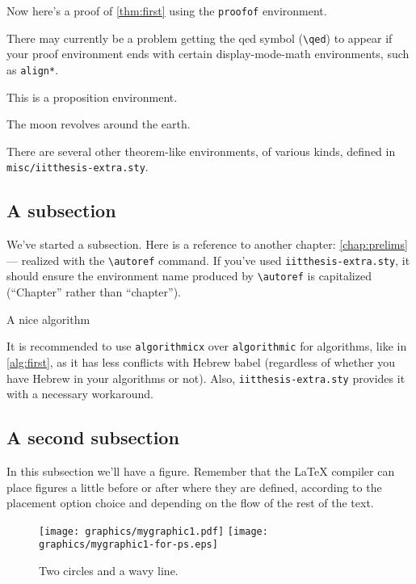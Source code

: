 Now here's a proof of \autoref{thm:first} using the \verb|proofof| environment.
\begin{proofof}
\lipsum[3]
\end{proofof}

\begin{note}There may currently be a problem getting the \gls{qed} symbol (\verb|\qed|) to appear if your proof environment ends with certain display-mode-math environments, such as \verb|align*|.
\end{note}

\begin{proposition}
\label{prop:first}
This is a proposition environment. 
\end{proposition}

\begin{observation}
\label{obs:first}
The moon revolves around the earth.
\end{observation}

There are several other theorem-like environments, of various kinds, defined in \texttt{misc/iitthesis-extra.sty}.

\subsection{A subsection}

We've started a subsection. Here is a reference to another chapter: \autoref{chap:prelims} --- realized with the \verb|\autoref| command. If you've used \texttt{iitthesis-extra.sty}, it should ensure the environment name produced by \verb|\autoref| is capitalized (``Chapter'' rather than ``chapter'').

\begin{algorithm}
\caption{A nice algorithm}
\label{alg:first}
\begin{algorithmic}[1]
\ENDFOR
{}
\end{algorithmic}
\end{algorithm}

It is recommended to use \texttt{algorithmicx} over \texttt{algorithmic} for algorithms, like in \autoref{alg:first}, as it has less conflicts with Hebrew babel (regardless of whether you have Hebrew in your algorithms or not). Also, \texttt{iitthesis-extra.sty} provides it with a necessary workaround.

\subsection{A second subsection}

In this subsection we'll have a figure. Remember that the {\LaTeX} compiler can place figures a little before or after where they are defined, according to the placement option choice and depending on the flow of the rest of the text.

\begin{figure}[htb]
  \centering
  \ifpdf
    \texttt{[image: graphics/mygraphic1.pdf]}
  \else
    \texttt{[image: graphics/mygraphic1-for-ps.eps]}
  \fi
  \caption{Two circles and a wavy line.}
\end{figure}

